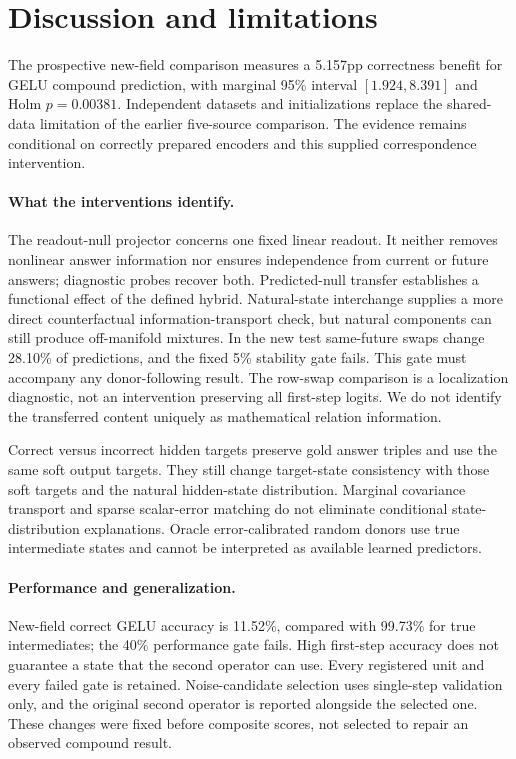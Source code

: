 \section{Discussion and limitations}
The prospective new-field comparison measures a 5.157pp correctness benefit for GELU compound prediction, with marginal 95\% interval $[1.924,8.391]$ and Holm $p=0.00381$. Independent datasets and initializations replace the shared-data limitation of the earlier five-source comparison. The evidence remains conditional on correctly prepared encoders and this supplied correspondence intervention.

\paragraph{What the interventions identify.}
The readout-null projector concerns one fixed linear readout. It neither removes nonlinear answer information nor ensures independence from current or future answers; diagnostic probes recover both. Predicted-null transfer establishes a functional effect of the defined hybrid. Natural-state interchange supplies a more direct counterfactual information-transport check, but natural components can still produce off-manifold mixtures. In the new test same-future swaps change 28.10\% of predictions, and the fixed 5\% stability gate fails. This gate must accompany any donor-following result. The row-swap comparison is a localization diagnostic, not an intervention preserving all first-step logits. We do not identify the transferred content uniquely as mathematical relation information.

Correct versus incorrect hidden targets preserve gold answer triples and use the same soft output targets. They still change target-state consistency with those soft targets and the natural hidden-state distribution. Marginal covariance transport and sparse scalar-error matching do not eliminate conditional state-distribution explanations. Oracle error-calibrated random donors use true intermediate states and cannot be interpreted as available learned predictors.

\paragraph{Performance and generalization.}
New-field correct GELU accuracy is 11.52\%, compared with 99.73\% for true intermediates; the 40\% performance gate fails. High first-step accuracy does not guarantee a state that the second operator can use. Every registered unit and every failed gate is retained. Noise-candidate selection uses single-step validation only, and the original second operator is reported alongside the selected one. These changes were fixed before composite scores, not selected to repair an observed compound result.

